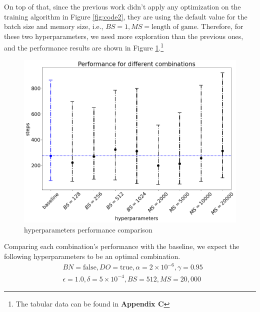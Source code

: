 \documentclass[letterpaper]{article} %
\begin{document}
\begin{itemize}
  On top of that, since the previous work didn't apply any optimization on the training algorithm in Figure \ref{fig:code2}, they are using the default value for the batch size and memory size, i.e., $BS=1, MS=\text{length of game}$. Therefore, for these two hyperparameters, we need more exploration than the previous ones, and the performance results are shown in Figure \ref{fig:hp2}.\footnote{The tabular data can be found in \textbf{Appendix C}} 

  \begin{figure}[h!]
    \centering
    \includegraphics[width=0.9\linewidth]{figures/HP2}
    \caption{hyperparameters performance comparison}
    \label{fig:hp2}
  \end{figure}

  Comparing each combination's performance with the baseline, we expect the following hyperparameters to be an optimal combination.
  \begin{align*}
    &BN=\text{false}, DO=\text{true}, \alpha=2\times 10^{-6}, \gamma = 0.95\\
    &\epsilon=1.0,\delta=5\times 10^{-4}, BS=512, MS=20,000
  \end{align*}


\end{itemize}
\end{document}
